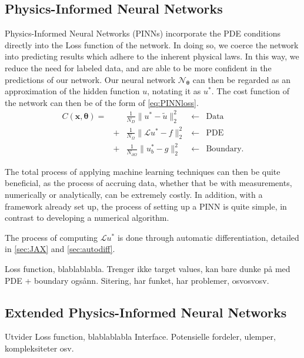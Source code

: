 \subsection{Physics-Informed Neural Networks}
Physics-Informed Neural Networks (PINNs) incorporate the PDE conditions directly into the Loss function of the network.
In doing so, we coerce the network into predicting results which adhere to the inherent physical laws.
In this way, we reduce the need for labeled data, and are able to be more confident in the predictions of our network.
Our neural network $\mathcal{N}_{\boldsymbol{\theta}}$ can then be regarded as an approximation of the hidden function $u$, notating it as $u^*$.
The cost function of the network can then be of the form of \autoref{eq:PINNloss}.
\begin{equation}\label{eq:PINNloss}
\begin{array}{rrrrr}
    C(\boldsymbol{x}, \boldsymbol{\theta}) =& & \frac{1}{N_{D}}\lVert u^* - \tilde{u} \rVert_2^2 &\leftarrow& \text{Data} \\
    &+& \frac{1}{N_{\Omega}}\lVert \mathcal{L}u^* - f \rVert_2^2 &\leftarrow& \text{PDE} \\
    &+& \frac{1}{N_{\partial \Omega}} \lVert u^*_{b} - g \rVert_2^2 &\leftarrow& \text{Boundary}.
\end{array}
\end{equation}

The total process of applying machine learning techniques can then be quite beneficial, as the process of accruing data, whether that be with measurements, numerically or analytically, can be extremely costly.
In addition, with a framework already set up, the process of setting up a PINN is quite simple, in contrast to developing a numerical algorithm.

The process of computing $\mathcal{L}u^*$ is done through automatic differentiation, detailed in \autoref{sec:JAX} and \autoref{sec:autodiff}.

Loss function, blablablabla. Trenger ikke target values, kan bare dunke på med PDE + boundary ogsånn. Sitering, har funket, har problemer, osvosvosv.

\subsection{Extended Physics-Informed Neural Networks}
Utvider Loss function, blablablabla Interface. Potensielle fordeler, ulemper, kompleksiteter osv.
